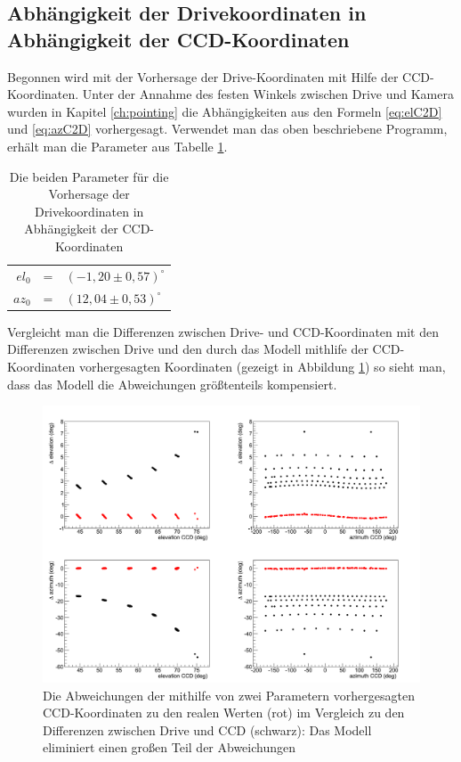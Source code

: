 \subsection{Abhängigkeit der Drivekoordinaten in Abhängigkeit der CCD-Koordinaten}
Begonnen wird mit der Vorhersage der Drive-Koordinaten mit Hilfe der CCD-Koordinaten. Unter der Annahme des festen Winkels zwischen Drive und Kamera wurden in Kapitel \ref{ch:pointing} die Abhängigkeiten aus den Formeln \ref{eq:elC2D} und \ref{eq:azC2D} vorhergesagt. Verwendet man das oben beschriebene Programm, erhält man die Parameter aus Tabelle \ref{tab:C2D}.
\begin{table}[htbp]
\centering
\begin{tabular}{rcl}
\toprule
$el_0$ &=& $(-1,20\pm0,57)^{\circ}$\\
$az_0$ &=& $(12,04\pm0,53)^{\circ}$\\
\bottomrule
\end{tabular}
\caption{Die beiden Parameter für die Vorhersage der Drivekoordinaten in Abhängigkeit der CCD-Koordinaten}
\label{tab:C2D}
\end{table}
Vergleicht man die Differenzen zwischen Drive- und CCD-Koordinaten mit den Differenzen zwischen Drive und den durch das Modell mithlife der CCD-Koordinaten vorhergesagten Koordinaten (gezeigt in Abbildung \ref{img:C2Dcomp}) so sieht man, dass das Modell die Abweichungen größtenteils kompensiert.%
\begin{figure}[htbp]
\centering
\includegraphics[width=\textwidth]{../341/C2Dcomp.png}
\caption{Die Abweichungen der mithilfe von zwei Parametern vorhergesagten CCD-Koordinaten zu den realen Werten (rot) im Vergleich zu den Differenzen zwischen Drive und CCD (schwarz): Das Modell eliminiert einen großen Teil der Abweichungen}
\label{img:C2Dcomp}
\end{figure}
